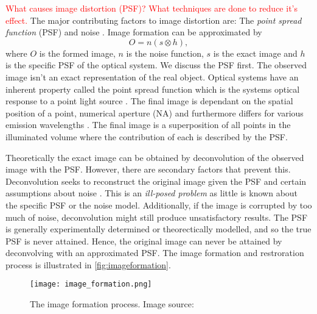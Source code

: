 \begin{definition}
	\textcolor{red}{What causes image distortion (PSF)? What techniques are done to reduce it's effect.}
	The major contributing factors to image distortion are: The \textit{point spread function} (PSF) and noise \citep{Sarder2006}.
	Image formation can be approximated by 
	\begin{equation}
		O = n(s \otimes h),
	\end{equation}
	where $O$ is the formed image, $n$ is the noise function, $s$ is the exact image and $h$ is the specific PSF of the optical system.
	We discuss the PSF first.
	The observed image isn't an exact representation of the real object.
	Optical systems have an inherent property called the point spread function which is the systems optical response to a point light source \citep{Danek2012}.
	The final image is dependant on the spatial position of a point, numerical aperture (NA) and furthermore differs for various emission wavelengths \citep{Hubeny2008,Keuper2012}.
	The final image is a superposition of all points in the illuminated volume where the contribution of each is described by the PSF.
	
	Theoretically the exact image can be obtained by deconvolution of the observed image with the PSF.
	However, there are secondary factors that prevent this.
	Deconvolution seeks to reconstruct the original image given the PSF and certain assumptions about noise \citep{Keuper2012}.
	This is an \textit{ill-posed problem} as little is known about the specific PSF or the noise model.
	Additionally, if the image is corrupted by too much of noise, deconvolution might still produce unsatisfactory results.
	The PSF is generally experimentally determined or theorectically modelled, and so the true PSF is never attained.
	Hence, the original image can never be attained by deconvolving with an approximated PSF.
	The image formation and restroration process is illustrated in \autoref{fig:imageformation}.
	
	\begin{figure}[!t]
		\centering
		\texttt{[image: image\_formation.png]}
		\caption{The image formation process. Image source: \citep{cil:40968}}
		\label{fig:imageformation}
	\end{figure}
	

\end{definition}
